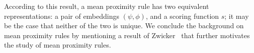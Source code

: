 \documentclass[prodmode,acmec]{ec-acmsmall}
\newcommand{\calL}{{\mathcal{L}}}
\newcommand{\rank}{{\calL(A)}}
\newcommand{\calO}{{\mathcal{O}}}
\begin{document}
%

\noindent
According to this result, a mean proximity rule has two equivalent representations: a pair of embeddings $(\psi,\phi)$, and a scoring function $s$; it may be the case that neither of the two is unique. We conclude the background on mean proximity rules by mentioning a result of Zwicker~ that further motivates the study of mean proximity rules.
\end{document}
